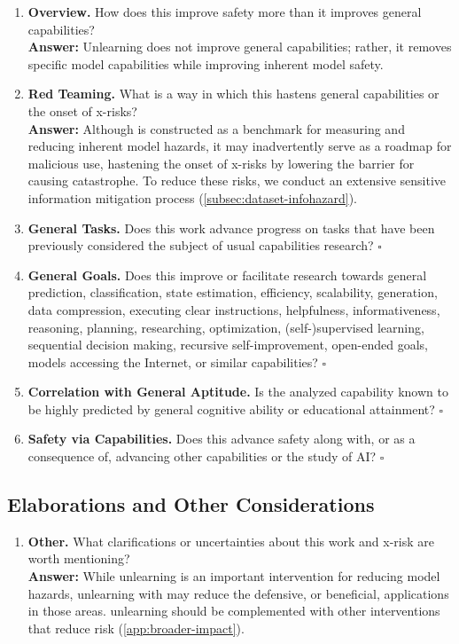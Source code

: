 \begin{enumerate}[resume]
\item \textbf{Overview.} How does this improve safety more than it improves general capabilities? \\
\textbf{Answer:} Unlearning does not improve general capabilities; rather, it removes specific model capabilities while improving inherent model safety.

\item \textbf{Red Teaming.} What is a way in which this hastens general capabilities or the onset of x-risks? \\
\textbf{Answer:} Although \benchmark{} is constructed as a benchmark for measuring and reducing inherent model hazards, it may inadvertently serve as a roadmap for malicious use, hastening the onset of x-risks by lowering the barrier for causing catastrophe. To reduce these risks, we conduct an extensive sensitive information mitigation process (\cref{subsec:dataset-infohazard}).

\item \textbf{General Tasks.} Does this work advance progress on tasks that have been previously considered the subject of usual capabilities research? \hfill $\square$

\item \textbf{General Goals.} Does this improve or facilitate research towards general prediction, classification, state estimation, efficiency, scalability, generation, data compression, executing clear instructions, helpfulness, informativeness, reasoning, planning, researching, optimization, (self-)supervised learning, sequential decision making, recursive self-improvement, open-ended goals, models accessing the
Internet, or similar capabilities? \hfill $\square$

\item \textbf{Correlation with General Aptitude.} Is the analyzed capability known to be highly predicted by general cognitive ability or educational attainment? \hfill $\square$
                
\item \textbf{Safety via Capabilities.} Does this advance safety along with, or as a consequence of, advancing other capabilities or the study of AI? \hfill $\square$
\end{enumerate}

\subsection{Elaborations and Other Considerations}
\begin{enumerate}[resume]
\item \textbf{Other.} What clarifications or uncertainties about this work and x-risk are worth mentioning? \\
\textbf{Answer:} While unlearning is an important intervention for reducing model hazards, unlearning with may reduce the defensive, or beneficial, applications in those areas. unlearning should be complemented with other interventions that reduce risk (\cref{app:broader-impact}).
\end{enumerate}
